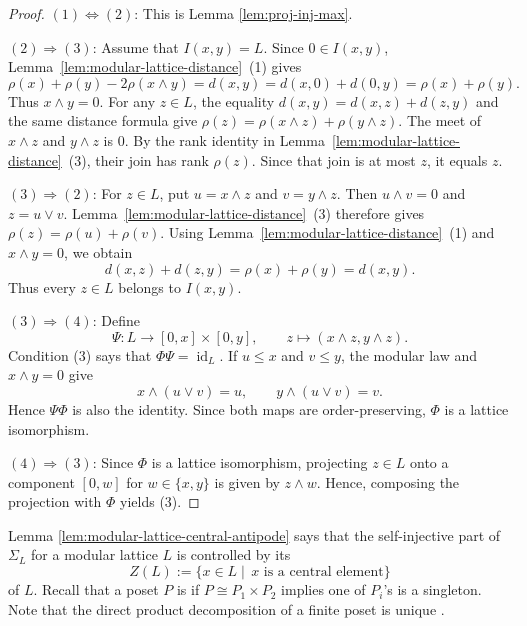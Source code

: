 \documentclass[a4paper,leqno]{amsart}
\begin{document}
\begin{proof}
$(1)\Leftrightarrow(2)$: This is Lemma \ref{lem:proj-inj-max}.

$(2)\Rightarrow(3)$: Assume that $I(x,y)=L$. Since $0\in I(x,y)$,
Lemma~\ref{lem:modular-lattice-distance}~(1) gives
\[
\rho(x)+\rho(y)-2\rho(x\wedge y)
=d(x,y)=d(x,0)+d(0,y)=\rho(x)+\rho(y).
\]
Thus $x\wedge y=0$. For any $z\in L$, the equality
$d(x,y)=d(x,z)+d(z,y)$ and the same distance formula give
$\rho(z)=\rho(x\wedge z)+\rho(y\wedge z)$. The meet of $x\wedge z$ and
$y\wedge z$ is $0$. By the rank identity in
Lemma~\ref{lem:modular-lattice-distance}~(3), their join has rank
$\rho(z)$. Since that join is at most $z$, it equals $z$.

$(3)\Rightarrow(2)$: For $z\in L$, put $u=x\wedge z$ and
$v=y\wedge z$. Then $u\wedge v=0$ and $z=u\vee v$.
Lemma~\ref{lem:modular-lattice-distance}~(3) therefore gives
$\rho(z)=\rho(u)+\rho(v)$. Using
Lemma~\ref{lem:modular-lattice-distance}~(1) and $x\wedge y=0$, we obtain
\[
d(x,z)+d(z,y)=\rho(x)+\rho(y)=d(x,y).
\]
Thus every $z\in L$ belongs to $I(x,y)$.

$(3)\Rightarrow(4)$: Define
\[
\Psi:L\longrightarrow[0,x]\times[0,y],
\qquad z\longmapsto(x\wedge z,y\wedge z).
\]
Condition (3) says that $\Phi\Psi=\operatorname{id}_L$. If $u\leq x$
and $v\leq y$, the modular law and $x\wedge y=0$ give
\[
x\wedge(u\vee v)=u,
\qquad
y\wedge(u\vee v)=v.
\]
Hence $\Psi\Phi$ is also the identity. Since both maps are
order-preserving, $\Phi$ is a lattice isomorphism.

$(4)\Rightarrow(3)$: Since $\Phi$ is a lattice isomorphism, projecting $z\in L$ onto a component $[0,w]$ for $w\in\{x,y\}$ is given by $z\wedge w$.  Hence, composing the projection with $\Phi$ yields (3).
\end{proof}

Lemma \ref{lem:modular-lattice-central-antipode} says that the self-injective part of $\Sigma_L$ for a modular lattice $L$ is controlled by its  
$$ Z(L):=\{ x \in L\mid \, x \text{ is a central element}\}$$
of $L$.  
Recall that a poset $P$ is  if $P\cong P_1\times P_2$ implies one of $P_i$'s is a singleton.  Note that the direct product decomposition of a finite poset is unique \cite{Has51}.  
\end{document}
